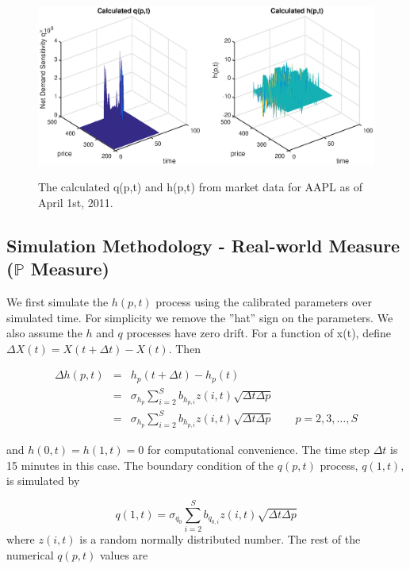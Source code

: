 \documentclass{article}
\begin{document}
\begin{center}
\begin{figure}
  \centering
  \includegraphics[scale = 0.5]{q_and_h.eps}\\
  \caption{The calculated q(p,t) and h(p,t) from market data for AAPL as of April 1st, 2011.}\label{fig::AAPL_20110401_q_and_h}
\end{figure}
\end{center}


\subsection{Simulation Methodology - Real-world Measure ($\mathbb{P}$ Measure)}
We first simulate the $h(p,t)$ process using the calibrated parameters over simulated time. For simplicity we remove the ''hat'' sign on the parameters. We also assume the $h$ and $q$ processes have zero drift. For a function of x(t), define $\Delta X(t) = X(t+\Delta t) - X(t)$. Then

\begin{eqnarray*}
\Delta h(p,t) &=& h_p(t+\Delta t) - h_p(t) \\
        &=& \sigma_{h_p} \sum_{i=2}^{S} b_{h_{p, i}} z(i,t) \sqrt{\Delta t \Delta p} \\
        &=& \sigma_{h_p} \sum_{i=2}^{S} b_{h_{p, i}} z(i,t) \sqrt{\Delta t \Delta p} \qquad p = 2, 3, \ldots, S
\end{eqnarray*}

and $h(0,t) = h(1,t) = 0$ for computational convenience. The time step $\Delta t$ is 15 minutes in this case. The boundary condition of the $q(p,t)$ process, $q(1,t)$, is simulated by

$$
q(1,t) = \sigma_{q_0} \sum_{i=2}^{S} b_{q_{0, i}} z(i,t) \sqrt{\Delta t \Delta p}
$$
where $z(i,t)$ is a random normally distributed number. The rest of the numerical $q(p,t)$ values are
\end{document}
